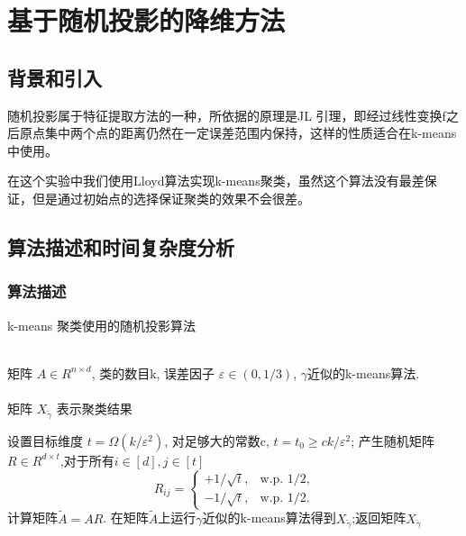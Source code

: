 \documentclass{ctexart}
\begin{document}
    \section{基于随机投影的降维方法}
    \label{sec:rpsec}

    \subsection{背景和引入}
        随机投影属于特征提取方法的一种，所依据的原理是JL 引理\cite{johnson1984extensions}，即经过线性变换f之后原点集中两个点的距离仍然在一定误差范围内保持，这样的性质适合在k-means中使用。

        在这个实验中我们使用Lloyd算法实现k-means聚类，虽然这个算法没有最差保证，但是通过初始点的选择保证聚类的效果不会很差。

    \subsection{算法描述和时间复杂度分析}
    \subsubsection{算法描述}
    \renewcommand{\algorithmicrequire}{ \textbf{Input:}} %
    \renewcommand{\algorithmicensure}{ \textbf{Output:}} %
    \begin{algorithm}[htb]
    \caption{k-means 聚类使用的随机投影算法}
    \label{RP}
        \begin{algorithmic}[1] %
        \REQUIRE ~~\\ %
            矩阵 $ A \in R^{n \times d}$, 类的数目k, 误差因子 $\varepsilon \in (0, 1/3)$, $\gamma$近似的k-means算法. \\
        \ENSURE ~~\\ %
            矩阵 $ X_{\tilde{\gamma}} $ 表示聚类结果

        \STATE 设置目标维度 $ t = \Omega(k/\varepsilon^2)$, 对足够大的常数c, $t = t_{0} \ge ck/\varepsilon^2 $;
        \label{ step 1 }%
        \STATE 产生随机矩阵 $ R \in R^{d \times t} $,对于所有$ i \in [d], j \in [t]$
        \begin{equation*}
        R_{ij} = \begin{cases} +1/\sqrt{t},& \mbox{w.p. 1/2,} \\ -1/\sqrt{t}, & \mbox{w.p. 1/2.}\end{cases}
        \end{equation*}
        \label{step 2}
        \STATE 计算矩阵$\tilde{A} = AR$.
        \label{step 3}
        \STATE 在矩阵$ \tilde{A}$上运行$\gamma$近似的k-means算法得到$X_{\tilde{\gamma}}$;返回矩阵$ X_{\tilde{\gamma}}$
        \label{step 4}
        \end{algorithmic}
    \end{algorithm}
\end{document}
